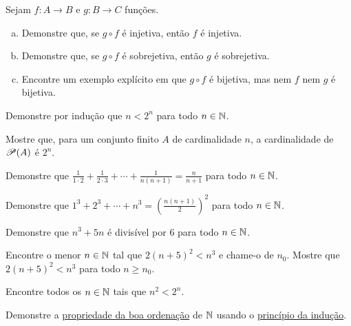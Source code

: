 \begin{exercise}
Sejam $f \colon A \to B$ e $g \colon B \to C$ funções.
\begin{enumerate}[a)]
\item
Demonstre que, se $g \circ f$ é injetiva, então $f$ é injetiva.
\item
Demonstre que, se $g \circ f$ é sobrejetiva, então $g$ é sobrejetiva.
\item
Encontre um exemplo explícito em que $g \circ f$ é bijetiva, mas nem $f$
nem $g$ é bijetiva.
\end{enumerate}
\end{exercise}

\begin{exercise}
\pagebreak[2]
Demonstre por indução que $n < 2^n$ para todo $n \in {\mathbb{N}}$.
\end{exercise}

\begin{exercise}
Mostre que, para um conjunto finito $A$ de cardinalidade $n$, a cardinalidade
de ${\mathscr{P}}(A)$ é $2^n$.
\end{exercise}

\begin{exercise}
Demonstre que $\frac{1}{1\cdot 2} +
\frac{1}{2\cdot 3} + \cdots + \frac{1}{n(n+1)} = \frac{n}{n+1}$
para todo $n \in {\mathbb{N}}$.
\end{exercise}

\begin{exercise}
Demonstre que $1^3 + 2^3 + \cdots + n^3 = {\left( \frac{n(n+1)}{2} \right)}^2$
para todo $n \in {\mathbb{N}}$.
\end{exercise}

\begin{exercise}
Demonstre que $n^3 + 5n$ é divisível por $6$ para todo $n \in {\mathbb{N}}$.
\end{exercise}

\begin{exercise}
Encontre o menor $n \in {\mathbb{N}}$ tal que $2{(n+5)}^2 < n^3$ e chame-o de $n_0$.
Mostre que $2{(n+5)}^2 < n^3$ para todo $n \geq n_0$.
\end{exercise}

\begin{exercise}
Encontre todos os $n \in {\mathbb{N}}$ tais que $n^2 < 2^n$.
\end{exercise}

\begin{exercise}
Demonstre a
\hyperlink{wop:link}{propriedade da boa ordenação} de ${\mathbb{N}}$ usando o
\hyperref[induction:thm]{princípio da indução}.
\end{exercise}


